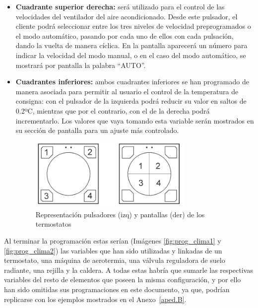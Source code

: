 \begin{itemize}
\item \textbf{Cuadrante superior derecha:} será utilizado para el control de las velocidades del ventilador del aire acondicionado. Desde este pulsador, el cliente podrá seleccionar entre los tres niveles de velocidad preprogramados o el modo automático, pasando por cada uno de ellos con cada pulsación, dando la vuelta de manera cíclica. En la pantalla aparecerá un número para indicar la velocidad del modo manual, o en el caso del modo automático, se mostrará por pantalla la palabra “AUTO”.
\item \textbf{Cuadrantes inferiores:} ambos cuadrantes inferiores se han programado de manera asociada para permitir al usuario el control de la temperatura de consigna: con el pulsador de la izquierda podrá reducir su valor en saltos de 0.2ºC, mientras que por el contrario, con el de la derecha podrá incrementarlo. Los valores que vaya tomando esta variable serán mostrados en su sección de pantalla para un ajuste más controlado.
\begin{figure}[H]
\begin{center}
\includegraphics[width=0.75\textwidth]{figures/iconos_term2.png}   
\caption{Representación pulsadores (izq) y pantallas (der) de los termostatos}
\label{fig:iconos_term2}
\end{center}
\end{figure}
\end{itemize}
Al terminar la programación estas serían (Imágenes \ref{fig:prog_clima1} y \ref{fig:prog_clima2}) las variables que han sido utilizadas y linkadas de un termostato,  una máquina de aerotermia, una válvula reguladora de suelo radiante, una rejilla y la caldera. A todas estas habría que sumarle las respectivas variables del resto de elementos que poseen la misma configuración, y por ello han sido omitidas sus programaciones en este documento, ya que, podrían replicarse con los ejemplos mostrados en el Anexo~\ref{aped.B}.

